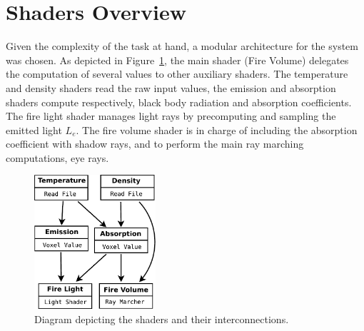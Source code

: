 \section{Shaders Overview}
\label{sec:shaders_overview}

Given the complexity of the task at hand, a modular architecture for the system was chosen.
As depicted in Figure~\ref{fig:shaders_diagram}, the main shader (Fire Volume) delegates the computation of several values to other auxiliary shaders.   
The temperature and density shaders read the raw input values, the emission and absorption shaders compute respectively, black body radiation and absorption coefficients.
The fire light shader manages light rays by precomputing and sampling the emitted light $L_e$.
The fire volume shader is in charge of including the absorption coefficient with shadow rays, and to perform the main ray marching computations, eye rays. 

\begin{figure}[htbp!]
	\centering
	\includegraphics[width=0.4\textwidth]{img/shaders_diagram}
	\caption{Diagram depicting the shaders and their interconnections.}
	\label{fig:shaders_diagram}
\end{figure}

